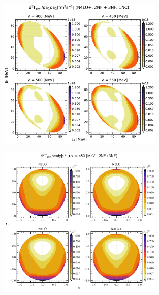     \begin{figure}[h]
        \begin{center}
        \includegraphics[width=0.7\textwidth]{PlotData/PION/Dalitz_maps/figures/Dalitz_map_pnn_E1E2_cutofs_1NC.pdf}
        \end{center}
        \caption{}
        \label{pion_map_E1E2_cutoff_1NC}
    \end{figure}

    \begin{figure}[h]
        \begin{center}
        \includegraphics[width=0.7\textwidth]{PlotData/PION/Dalitz_maps/figures/Dalitz_map_pnn_xy_orders.pdf}
        \end{center}
        \caption{}
        \label{pion_map_xy_order}
    \end{figure}

